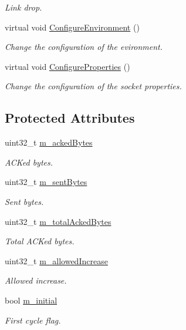 \begin{DoxyCompactItemize}
\begin{DoxyCompactList}\small\item\em Link drop. \end{DoxyCompactList}\item 
virtual void \hyperlink{classTcpSlowStartNormalTest_ab9d9461021dd59a1b313ae782a585d02}{Configure\+Environment} ()
\begin{DoxyCompactList}\small\item\em Change the configuration of the evironment. \end{DoxyCompactList}\item 
virtual void \hyperlink{classTcpSlowStartNormalTest_ace9df69a13ac23204d57b6fb036e4af3}{Configure\+Properties} ()
\begin{DoxyCompactList}\small\item\em Change the configuration of the socket properties. \end{DoxyCompactList}\end{DoxyCompactItemize}
\subsection*{Protected Attributes}
\begin{DoxyCompactItemize}
\item 
uint32\+\_\+t \hyperlink{classTcpSlowStartNormalTest_a600d8138b3928e08220753e932184aaf}{m\+\_\+acked\+Bytes}
\begin{DoxyCompactList}\small\item\em A\+C\+Ked bytes. \end{DoxyCompactList}\item 
uint32\+\_\+t \hyperlink{classTcpSlowStartNormalTest_ac1fa24a51c073dbc9727c46409a7c86b}{m\+\_\+sent\+Bytes}
\begin{DoxyCompactList}\small\item\em Sent bytes. \end{DoxyCompactList}\item 
uint32\+\_\+t \hyperlink{classTcpSlowStartNormalTest_ac8401e0be3bf91fa46b08246e3263f50}{m\+\_\+total\+Acked\+Bytes}
\begin{DoxyCompactList}\small\item\em Total A\+C\+Ked bytes. \end{DoxyCompactList}\item 
uint32\+\_\+t \hyperlink{classTcpSlowStartNormalTest_af8e569787001a3fb9d2d3691613cf4f0}{m\+\_\+allowed\+Increase}
\begin{DoxyCompactList}\small\item\em Allowed increase. \end{DoxyCompactList}\item 
bool \hyperlink{classTcpSlowStartNormalTest_a013ae131e0712980cce8833b6e2271c2}{m\+\_\+initial}
\begin{DoxyCompactList}\small\item\em First cycle flag. \end{DoxyCompactList}\end{DoxyCompactItemize}
